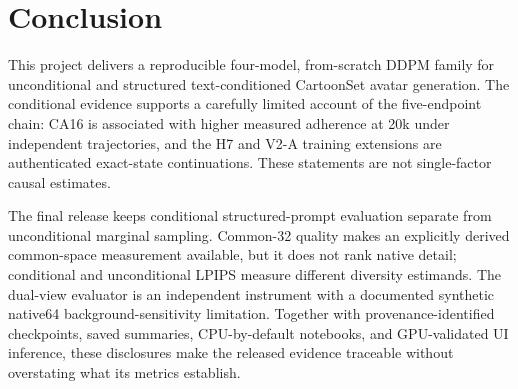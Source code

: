 \section{Conclusion}\label{sec:conclusion}
This project delivers a reproducible four-model, from-scratch DDPM family for unconditional and structured text-conditioned CartoonSet avatar generation. The conditional evidence supports a carefully limited account of the five-endpoint chain: CA16 is associated with higher measured adherence at 20k under independent trajectories, and the H7 and V2-A training extensions are authenticated exact-state continuations. These statements are not single-factor causal estimates.

The final release keeps conditional structured-prompt evaluation separate from unconditional marginal sampling. Common-32 quality makes an explicitly derived common-space measurement available, but it does not rank native detail; conditional and unconditional LPIPS measure different diversity estimands. The dual-view evaluator is an independent instrument with a documented synthetic native64 background-sensitivity limitation. Together with provenance-identified checkpoints, saved summaries, CPU-by-default notebooks, and GPU-validated UI inference, these disclosures make the released evidence traceable without overstating what its metrics establish.
